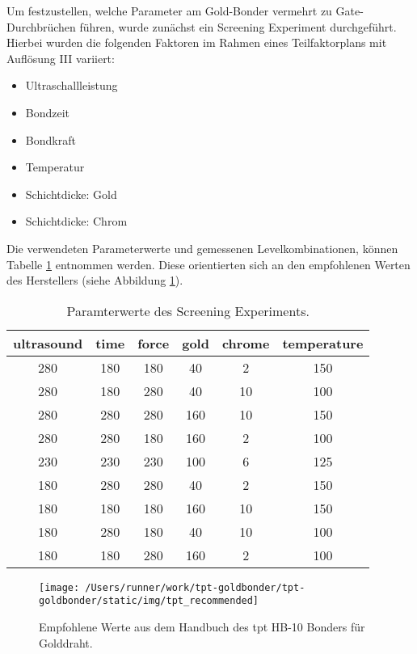 \documentclass[
  paper=a4,
  ,captions=tableheading
]{scrartcl}
\providecommand{\tightlist}{%
  \setlength{\itemsep}{0pt}\setlength{\parskip}{0pt}}
\begin{document}
Um festzustellen, welche Parameter am Gold-Bonder vermehrt zu Gate-Durchbrüchen führen, wurde zunächst ein Screening Experiment durchgeführt. Hierbei wurden die folgenden Faktoren im Rahmen eines Teilfaktorplans mit Auflösung III variiert:

\begin{itemize}
\tightlist
\item
  Ultraschallleistung
\item
  Bondzeit
\item
  Bondkraft
\item
  Temperatur
\item
  Schichtdicke: Gold
\item
  Schichtdicke: Chrom
\end{itemize}

Die verwendeten Parameterwerte und gemessenen Levelkombinationen, können Tabelle \ref{tab:screening-design} entnommen werden. Diese orientierten sich an den empfohlenen Werten des Herstellers (siehe Abbildung \ref{fig:recommended-values}).

\begin{table}

\caption{\label{tab:screening-design}Paramterwerte des Screening Experiments.}
\centering
\begin{tabular}[t]{c|c|c|c|c|c}
\hline
ultrasound & time & force & gold & chrome & temperature\\
\hline
280 & 180 & 180 & 40 & 2 & 150\\
\hline
280 & 180 & 280 & 40 & 10 & 100\\
\hline
280 & 280 & 280 & 160 & 10 & 150\\
\hline
280 & 280 & 180 & 160 & 2 & 100\\
\hline
230 & 230 & 230 & 100 & 6 & 125\\
\hline
180 & 280 & 280 & 40 & 2 & 150\\
\hline
180 & 180 & 180 & 160 & 10 & 150\\
\hline
180 & 280 & 180 & 40 & 10 & 100\\
\hline
180 & 180 & 280 & 160 & 2 & 100\\
\hline
\end{tabular}
\end{table}

\begin{figure}

{\centering \texttt{[image: /Users/runner/work/tpt-goldbonder/tpt-goldbonder/static/img/tpt\_recommended]} 

}

\caption{Empfohlene Werte aus dem Handbuch des tpt HB-10 Bonders für Golddraht.}\label{fig:recommended-values}
\end{figure}
\end{document}
